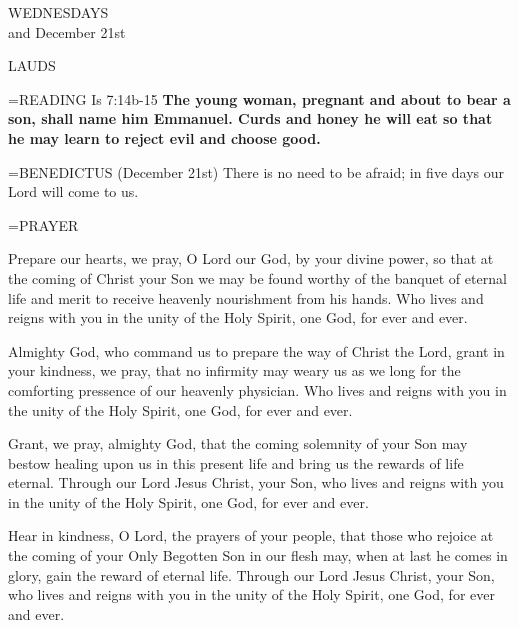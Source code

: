 \begin{center}\normalsize WEDNESDAYS\\
\footnotesize and December 21st\\
\end{center}

\begin{flushleft}\normalsize LAUDS\\\end{flushleft}

\hangindent=\parindent \small{\uppercase{READING}} Is 7:14b-15 \textbf{The young woman, pregnant and about to bear a son, shall name him Emmanuel. Curds and honey he will eat so that he may learn to reject evil and choose good.\\}

\hangindent=\parindent \small{BENEDICTUS  (December 21st) There is no need to be afraid; in five days our Lord will come to us.\\}

\hangindent=\parindent \small PRAYER
\begin{description}[labelindent=\parindent, leftmargin=*]
\item [Week 1:]  Prepare our hearts, we pray, O Lord our God, by your divine power, so that at the coming of Christ your Son we may be found worthy of the banquet of eternal life and merit to receive heavenly nourishment from his hands. Who lives and reigns with you in the unity of the Holy Spirit, one God, for ever and ever.
\item [Week 2:]  Almighty God, who command us to prepare the way of Christ the Lord, grant in your kindness, we pray, that no infirmity may weary us as we long for the comforting pressence of our heavenly physician. Who lives and reigns with you in the unity of the Holy Spirit, one God, for ever and ever.
\item [Week 3:]  Grant, we pray, almighty God, that the coming solemnity of your Son may bestow healing upon us in this present life and bring us the rewards of life eternal. Through our Lord Jesus Christ, your Son, who lives and reigns with you in the unity of the Holy Spirit, one God, for ever and ever.
\item [December 21st:]  Hear in kindness, O Lord, the prayers of your people, that those who rejoice at the coming of your Only Begotten Son in our flesh may, when at last he comes in glory, gain the reward of eternal life. Through our Lord Jesus Christ, your Son, who lives and reigns with you in the unity of the Holy Spirit, one God, for ever and ever.
\end{description}

